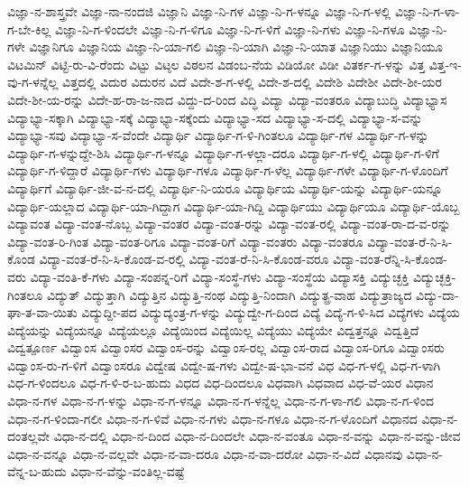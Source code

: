 {ವಿಜ್ಞಾ-ನ-ಶಾಸ್ತ್ರವೇ
ವಿಜ್ಞಾ-ನಾ-ನಂದಜಿ
ವಿಜ್ಞಾನಿ
ವಿಜ್ಞಾ-ನಿ-ಗಳ
ವಿಜ್ಞಾ-ನಿ-ಗ-ಳನ್ನೂ
ವಿಜ್ಞಾ-ನಿ-ಗ-ಳಲ್ಲಿ
ವಿಜ್ಞಾ-ನಿ-ಗ-ಳಾ-ಗ-ಬೇ-ಕಿಲ್ಲ
ವಿಜ್ಞಾ-ನಿ-ಗ-ಳಿಂದಲೇ
ವಿಜ್ಞಾ-ನಿ-ಗ-ಳಿಗೂ
ವಿಜ್ಞಾ-ನಿ-ಗ-ಳಿಗೆ
ವಿಜ್ಞಾ-ನಿ-ಗಳು
ವಿಜ್ಞಾ-ನಿ-ಗಳೂ
ವಿಜ್ಞಾ-ನಿ-ಗಳೇ
ವಿಜ್ಞಾನಿಗೂ
ವಿಜ್ಞಾನಿಯ
ವಿಜ್ಞಾ-ನಿ-ಯಾ-ಗಲಿ
ವಿಜ್ಞಾ-ನಿ-ಯಾಗಿ
ವಿಜ್ಞಾ-ನಿ-ಯಾತ
ವಿಜ್ಞಾನಿಯು
ವಿಜ್ಞಾನಿಯೂ
ವಿಟಮಿನ್
ವಿಟ್ಟಿ-ರು-ವಿ-ರೆಂದು
ವಿಟ್ಟು
ವಿಟ್ಠಲ
ವಿಠಲನ
ವಿಡಂಬ-ನೆಯ
ವಿಡಿಯೋ
ವಿಡೀ
ವಿತರ್ಕ-ಗ-ಳನ್ನು
ವಿತ್ತ
ವಿತ್ತ-ಇ-ವು-ಗ-ಳನ್ನೆಲ್ಲ
ವಿತ್ತದಲ್ಲಿ
ವಿದುರ
ವಿದುರನ
ವಿದೆ
ವಿದೇ-ಶ-ಗ-ಳಲ್ಲಿ
ವಿದೇ-ಶ-ದಲ್ಲಿ
ವಿದೇಶಿ
ವಿದೇಶೀ
ವಿದೇ-ಶೀ-ಯರ
ವಿದೇ-ಶೀ-ಯ-ರನ್ನು
ವಿದೇ-ಹ-ರಾ-ಜ-ನಾದ
ವಿದ್ದು-ದ-ರಿಂದ
ವಿದ್ಧಿ
ವಿದ್ಯಾ
ವಿದ್ಯಾ-ವಂತರೂ
ವಿದ್ಯಾಬುದ್ಧಿ
ವಿದ್ಯಾಭ್ಯಾಸ
ವಿದ್ಯಾಭ್ಯಾ-ಸಕ್ಕಾಗಿ
ವಿದ್ಯಾಭ್ಯಾ-ಸಕ್ಕೆ
ವಿದ್ಯಾಭ್ಯಾ-ಸಕ್ಕೆಂದು
ವಿದ್ಯಾಭ್ಯಾ-ಸದ
ವಿದ್ಯಾಭ್ಯಾ-ಸ-ದಲ್ಲಿ
ವಿದ್ಯಾಭ್ಯಾ-ಸ-ವನ್ನು
ವಿದ್ಯಾಭ್ಯಾ-ಸವು
ವಿದ್ಯಾಭ್ಯಾ-ಸ-ವೆಂದೇ
ವಿದ್ಯಾರ್ಥಿ
ವಿದ್ಯಾರ್ಥಿ-ಗ-ಳಿ-ಗಿಂತಲೂ
ವಿದ್ಯಾರ್ಥಿ-ಗಳ
ವಿದ್ಯಾರ್ಥಿ-ಗ-ಳನ್ನು
ವಿದ್ಯಾರ್ಥಿ-ಗ-ಳನ್ನುದ್ದೇ-ಶಿಸಿ
ವಿದ್ಯಾರ್ಥಿ-ಗ-ಳನ್ನೂ
ವಿದ್ಯಾರ್ಥಿ-ಗ-ಳಲ್ಲಾ-ದರೂ
ವಿದ್ಯಾರ್ಥಿ-ಗ-ಳಲ್ಲಿ
ವಿದ್ಯಾರ್ಥಿ-ಗ-ಳಿಗೆ
ವಿದ್ಯಾರ್ಥಿ-ಗ-ಳಿದ್ದಾರೆ
ವಿದ್ಯಾರ್ಥಿ-ಗಳು
ವಿದ್ಯಾರ್ಥಿ-ಗಳೂ
ವಿದ್ಯಾರ್ಥಿ-ಗ-ಳೆಲ್ಲ
ವಿದ್ಯಾರ್ಥಿ-ಗಳೇ
ವಿದ್ಯಾರ್ಥಿ-ಗ-ಳೊಂದಿಗೆ
ವಿದ್ಯಾರ್ಥಿಗೆ
ವಿದ್ಯಾರ್ಥಿ-ಜೀ-ವ-ನ-ದಲ್ಲಿ
ವಿದ್ಯಾರ್ಥಿ-ನಿ-ಯರೂ
ವಿದ್ಯಾರ್ಥಿಯ
ವಿದ್ಯಾರ್ಥಿ-ಯನ್ನು
ವಿದ್ಯಾರ್ಥಿ-ಯನ್ನೂ
ವಿದ್ಯಾರ್ಥಿ-ಯಲ್ಲಾದ
ವಿದ್ಯಾರ್ಥಿ-ಯಾ-ಗಿದ್ದಾಗ
ವಿದ್ಯಾರ್ಥಿ-ಯಾ-ಗಿದ್ದಿ
ವಿದ್ಯಾರ್ಥಿಯು
ವಿದ್ಯಾರ್ಥಿಯೂ
ವಿದ್ಯಾರ್ಥಿ-ಯೊಬ್ಬ
ವಿದ್ಯಾವಂತ
ವಿದ್ಯಾ-ವಂತ-ನೊಬ್ಬ
ವಿದ್ಯಾ-ವಂತರ
ವಿದ್ಯಾ-ವಂತ-ರನ್ನು
ವಿದ್ಯಾ-ವಂತ-ರಲ್ಲಿ
ವಿದ್ಯಾ-ವಂತ-ರಾ-ದ-ವ-ರನ್ನು
ವಿದ್ಯಾ-ವಂತ-ರಿ-ಗಿಂತ
ವಿದ್ಯಾ-ವಂತ-ರಿಗೂ
ವಿದ್ಯಾ-ವಂತ-ರಿಗೆ
ವಿದ್ಯಾ-ವಂತರು
ವಿದ್ಯಾ-ವಂತರೂ
ವಿದ್ಯಾ-ವಂತ-ರೆ-ನಿ-ಸಿ-ಕೊಂಡ
ವಿದ್ಯಾ-ವಂತ-ರೆ-ನಿ-ಸಿ-ಕೊಂಡ-ವ-ರಲ್ಲಿ
ವಿದ್ಯಾ-ವಂತ-ರೆ-ನಿ-ಸಿ-ಕೊಂಡ-ವರೂ
ವಿದ್ಯಾ-ವಂತ-ರೆನ್ನಿ-ಸಿ-ಕೊಂಡ-ವರು
ವಿದ್ಯಾ-ವಂತಿ-ಕೆ-ಗಳು
ವಿದ್ಯಾ-ಸಂಪನ್ನ-ರಿಗೆ
ವಿದ್ಯಾ-ಸಂಸ್ಥೆ-ಗಳು
ವಿದ್ಯಾ-ಸಂಸ್ಥೆಯ
ವಿದ್ಯಾಸಕ್ತಿ
ವಿದ್ಯುಚ್ಛಕ್ತಿ
ವಿದ್ಯುಚ್ಛಕ್ತಿ-ಗಿಂತಲೂ
ವಿದ್ಯುತ್
ವಿದ್ಯುತ್ತಾಗಿ
ವಿದ್ಯುತ್ತಿನ
ವಿದ್ಯುತ್ತಿ-ನಂಥ
ವಿದ್ಯುತ್ತಿ-ನಿಂದಾಗಿ
ವಿದ್ಯುತ್ಪ್ರ-ವಾಹ
ವಿದ್ಯುತ್ರಾಜ್ಯದ
ವಿದ್ಯು-ದಾ-ಘಾ-ತ-ವಾ-ಯಿತು
ವಿದ್ಯುದ್ದೀ-ಪದ
ವಿದ್ಯುದ್ಯಂತ್ರ-ಗ-ಳನ್ನು
ವಿದ್ಯುದ್ವೇ-ಗ-ದಿಂದ
ವಿದ್ಯೆ
ವಿದ್ಯೆ-ಗ-ಳಿ-ಸಿದ
ವಿದ್ಯೆಗಳು
ವಿದ್ಯೆಯ
ವಿದ್ಯೆಯನ್ನು
ವಿದ್ಯೆಯನ್ನೂ
ವಿದ್ಯೆಯಲ್ಲೂ
ವಿದ್ಯೆಯಿಂದ
ವಿದ್ಯೆಯಿಲ್ಲ
ವಿದ್ಯೆಯು
ವಿದ್ಯೆಯೇ
ವಿದ್ವತ್ತನ್ನೂ
ವಿದ್ವತ್ತಿದೆ
ವಿದ್ವತ್ಪೂರ್ಣ
ವಿದ್ವಾಂಸ
ವಿದ್ವಾಂಸರ
ವಿದ್ವಾಂಸ-ರನ್ನು
ವಿದ್ವಾಂಸ-ರಲ್ಲ
ವಿದ್ವಾಂಸ-ರಾದ
ವಿದ್ವಾಂಸ-ರಿಗೂ
ವಿದ್ವಾಂಸರು
ವಿದ್ವಾಂಸ-ರು-ಗ-ಳಿಗೆ
ವಿದ್ವಾಂಸರೂ
ವಿದ್ವೇಷ
ವಿದ್ವೇ-ಷ-ಗಳು
ವಿದ್ವೇ-ಷ-ಭಾ-ವನೆ
ವಿಧ
ವಿಧ-ಗ-ಳಲ್ಲಿ
ವಿಧ-ಗ-ಳಾಗಿ
ವಿಧ-ಗ-ಳಿಂದಲೂ
ವಿಧ-ಗ-ಳಿ-ರ-ಬ-ಹುದು
ವಿಧದ
ವಿಧ-ದಿಂದಲೂ
ವಿಧವಾಗಿ
ವಿಧವಾದ
ವಿಧ-ವೆ-ಯರ
ವಿಧಾನ
ವಿಧಾ-ನ-ಗಳ
ವಿಧಾ-ನ-ಗ-ಳನ್ನು
ವಿಧಾ-ನ-ಗ-ಳನ್ನೂ
ವಿಧಾ-ನ-ಗ-ಳನ್ನೆಲ್ಲ
ವಿಧಾ-ನ-ಗ-ಳಾ-ಗಲಿ
ವಿಧಾ-ನ-ಗ-ಳಿಂದ
ವಿಧಾ-ನ-ಗ-ಳಿಂದಾ-ಗಲೀ
ವಿಧಾ-ನ-ಗ-ಳಿವೆ
ವಿಧಾ-ನ-ಗಳು
ವಿಧಾ-ನ-ಗಳೂ
ವಿಧಾ-ನ-ಗ-ಳೊಂದಿಗೆ
ವಿಧಾನದ
ವಿಧಾ-ನ-ದಂತಲ್ಲವೇ
ವಿಧಾ-ನ-ದಲ್ಲಿ
ವಿಧಾ-ನ-ದಿಂದ
ವಿಧಾ-ನ-ದಿಂದಲೇ
ವಿಧಾ-ನ-ವಂತೂ
ವಿಧಾ-ನ-ವನ್ನು
ವಿಧಾ-ನ-ವನ್ನು-ಜೀವ
ವಿಧಾ-ನ-ವನ್ನೂ
ವಿಧಾ-ನ-ವಲ್ಲವೇ
ವಿಧಾ-ನ-ವಾ-ದರೂ
ವಿಧಾ-ನ-ವಾ-ದರೋ
ವಿಧಾ-ನ-ವಿದೆ
ವಿಧಾನವು
ವಿಧಾ-ನ-ವೆನ್ನ-ಬ-ಹುದು
ವಿಧಾ-ನ-ವೆನ್ನು-ವಂತಿಲ್ಲ-ವಷ್ಟೆ
}

